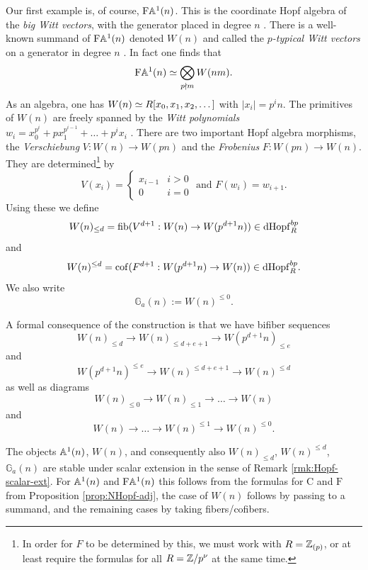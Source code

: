 \documentclass{amsart}
\numberwithin{proposition}{section}
\numberwithin{equation}{section}
\def\dHopf{\mathrm{dHopf}}
\newcommand{\Ga}{{\mathbb{G}_a}}
\def\Free{\mathrm{F}}
\def\Cofree{\mathrm{C}}
\begin{document}
Our first example is, of course, $\Free\A^1(n)$.
This is the coordinate Hopf algebra of the \emph{big Witt vectors}, with the generator placed in degree $n$ \cite[\S9]{hazewinkel-witt-vectors}.
There is a well-known summand of $\Free\A^1(n)$ denoted $W(n)$ and called the \emph{$p$-typical Witt vectors} on a generator in degree $n$ \cite[\S14.25]{hazewinkel-witt-vectors}.
In fact one finds that \cite[\S14.25]{hazewinkel-witt-vectors} \[ \Free\A^1(n) \wequi \bigotimes_{p \nmid m} W(nm). \]
As an algebra, one has $W(n) \simeq R[x_0, x_1, x_2, \dots]$ with $|x_i| = p^in$.
The primitives of $W(n)$ are freely spanned by the \emph{Witt polynomials} $w_i = x_0^{p^i} + px_1^{p^{i-1}} + \dots + p^i x_i$ \cite[Remark~(8.4)]{husemoller-hopf}.
There are two important Hopf algebra morphisms, the \emph{Verschiebung} $V: W(n) \to W(pn)$ and the \emph{Frobenius} $F: W(pn) \to W(n)$.
They are determined\footnote{In order for $F$ to be determined by this, we must work with $R=\mathbb{Z}_{(p)}$, or at least require the formulas for all $R=\mathbb{Z}/p^\nu$ at the same time.} by \cite[\S\S5.25, 5.27]{hazewinkel-witt-vectors} \[ V(x_i) = \begin{cases} x_{i-1} & i > 0 \\ 0 & i=0 \end{cases} \text{ and } F(w_i) = w_{i+1}. \]
Using these we define \[ W(n)_{\le d} = \fib(V^{d+1}: W(n) \to W(p^{d+1}n))  \in \dHopf_R^{bp} \] and \[ W(n)^{\le d} = \cof(F^{d+1}: W(p^{d+1}n) \to W(n)) \in \dHopf_R^{bp}. \]
We also write \[ \Ga(n) := W(n)^{\le 0}. \]

\begin{remark} \label{rmk:Witt-filtrations}
A formal consequence of the construction is that we have bifiber sequences \[ W(n)_{\le d} \to W(n)_{\le d+e+1} \to W(p^{d+1}n)_{\le e} \] and \[ W(p^{d+1}n)^{\le e} \to W(n)^{\le d+e+1} \to W(n)^{\le d} \] as well as diagrams \[ W(n)_{\le 0} \to W(n)_{\le 1} \to \dots \to W(n) \] and \[ W(n) \to \dots \to W(n)^{\le 1} \to W(n)^{\le 0}. \]
\end{remark}

\begin{remark} \label{rmk:W-scalar-ext}
The objects $\mathbb A^1(n)$, $W(n)$, and consequently also $W(n)_{\le d}$, $W(n)^{\le d}$, $\Ga(n)$ are stable under scalar extension in the sense of Remark \ref{rmk:Hopf-scalar-ext}.
For $\mathbb A^1(n)$ and $\Free \A^1(n)$ this follows from the formulas for $\Cofree$ and $\Free$ from Proposition \ref{prop:NHopf-adj}, the case of $W(n)$ follows by passing to a summand, and the remaining cases by taking fibers/cofibers.
\end{remark}
\end{document}
